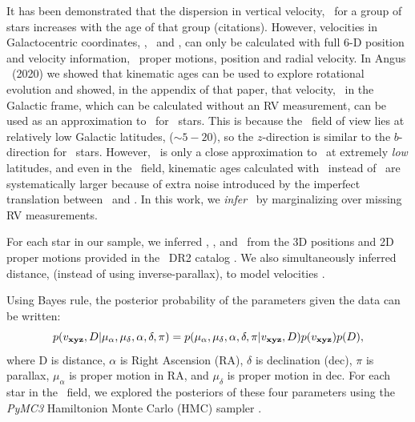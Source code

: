 It has been demonstrated that the dispersion in vertical velocity, \vz\, for a
group of stars increases with the age of that group (citations).
However, velocities in Galactocentric coordinates, \vx, \vy\ and \vz, can only
be calculated with full 6-D position and velocity information, \ie\ proper
motions, position and radial velocity.
In Angus \etal\ (2020) we showed that kinematic ages can be used to explore
rotational evolution and showed, in the appendix of that paper, that velocity,
\vb\ in the Galactic frame, which can be calculated without an RV measurement,
can be used as an approximation to \vz\ for \kepler\ stars.
This is because the \kepler\ field of view lies at relatively low Galactic
latitudes, ($\sim 5-20$\degrees), so the $z$-direction is similar to the
$b$-direction for \kepler\ stars.
However, \vb\ is only a close approximation to \vz\ at extremely {\it low}
latitudes, and even in the \kepler\ field, kinematic ages calculated with \vb\
instead of \vz\ are systematically larger because of extra noise introduced by
the imperfect translation between \vb\ and \vz .
In this work, we {\it infer} \vz\ by marginalizing over missing RV
measurements.

For each star in our sample, we inferred \vx, \vy, and \vz\ from the 3D
positions and 2D proper motions provided in the \gaia\ DR2 catalog
\citep{brown2011}.
We also simultaneously inferred distance, (instead of using inverse-parallax),
to model velocities \citep[see \eg][]{bailer-jones2015, bailer-jones2018}.

Using Bayes rule, the posterior probability of the parameters given the data
can be written:
\begin{equation}
p(v_{\bf xyz}, D | \mu_{\alpha}, \mu_{\delta}, \alpha, \delta, \pi) =
    p(\mu_{\alpha}, \mu_{\delta}, \alpha, \delta, \pi | v_{\bf xyz}, D)
    p(v_{\bf xyz}) p(D),
\end{equation}
where D is distance, $\alpha$ is Right Ascension (RA), $\delta$ is declination
(dec), $\pi$ is parallax, $\mu_\alpha$ is proper motion in RA, and
$\mu_\delta$ is proper motion in dec.
For each star in the \kepler\ field, we explored the posteriors of these four
parameters using the {\it PyMC3} Hamiltonion Monte Carlo (HMC) sampler
\racomment{(citations)}.

